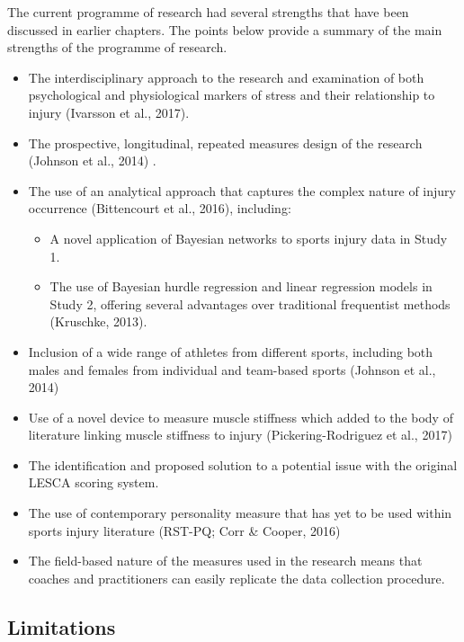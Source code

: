 \documentclass[man,floatsintext]{apa6}
\providecommand{\tightlist}{%
  \setlength{\itemsep}{0pt}\setlength{\parskip}{0pt}}
\begin{document}
The current programme of research had several strengths that have been discussed in earlier chapters.
The points below provide a summary of the main strengths of the programme of research.

\begin{itemize}
\item
  The interdisciplinary approach to the research and examination of both psychological and physiological markers of stress and their relationship to injury (Ivarsson et al., 2017).
\item
  The prospective, longitudinal, repeated measures design of the research (Johnson et al., 2014) .
\item
  The use of an analytical approach that captures the complex nature of injury occurrence (Bittencourt et al., 2016), including:

  \begin{itemize}
  \tightlist
  \item
    A novel application of Bayesian networks to sports injury data in Study 1.
  \item
    The use of Bayesian hurdle regression and linear regression models in Study 2, offering several advantages over traditional frequentist methods (Kruschke, 2013).
  \end{itemize}
\item
  Inclusion of a wide range of athletes from different sports, including both males and females from individual and team-based sports (Johnson et al., 2014)
\item
  Use of a novel device to measure muscle stiffness which added to the body of literature linking muscle stiffness to injury (Pickering-Rodriguez et al., 2017)
\item
  The identification and proposed solution to a potential issue with the original LESCA scoring system.
\item
  The use of contemporary personality measure that has yet to be used within sports injury literature (RST-PQ; Corr \& Cooper, 2016)
\item
  The field-based nature of the measures used in the research means that coaches and practitioners can easily replicate the data collection procedure.
\end{itemize}

\hypertarget{limitations}{%
\subsection{Limitations}\label{limitations}}
\end{document}
